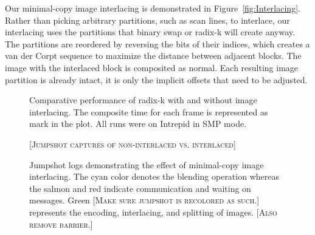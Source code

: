 \documentclass{vgtc}                          %
\newcommand{\sticky}[1]{{\color{red}\textsc{[#1]}}}
\begin{document}
Our minimal-copy image interlacing is demonstrated in
Figure~\ref{fig:Interlacing}.  Rather than picking arbitrary partitions,
such as scan lines, to interlace, our interlacing uses the partitions that
binary swap or radix-k will create anyway.  The partitions are reordered by
reversing the bits of their indices, which creates a van der Corpt sequence
to maximize the distance between adjacent blocks.  The image with the
interlaced block is composited as normal.  Each resulting image partition
is already intact, it is only the implicit offsets that need to be
adjusted.

\begin{figure}[htbp]
  \centering
  \hfill
  \caption{Comparative performance of radix-k with and without image
    interlacing.  The composite time for each frame is represented as mark
    in the plot.  All runs were on Intrepid in SMP mode.}
  \label{fig:InterlacePerformance}
\end{figure}

\begin{figure}[htbp]
  \centering
  \sticky{Jumpshot captures of non-interlaced vs. interlaced}
  \caption{Jumpshot logs demonstrating the effect of minimal-copy image
    interlacing.  The cyan color denotes the blending operation whereas the
    salmon and red indicate communication and waiting on messages.  Green
    \sticky{Make sure jumpshot is recolored as such.} represents the
    encoding, interlacing, and splitting of images. \sticky{Also remove
      barrier.}}
  \label{fig:InterlaceJumpshot}
\end{figure}
\end{document}
